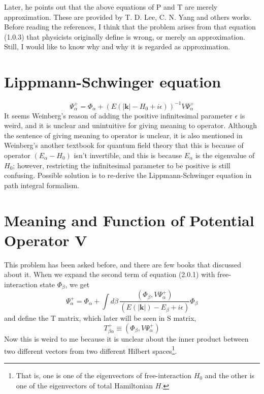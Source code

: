 \documentclass[12pt]{article}
\numberwithin{equation}{subsection}
\begin{document}
Later, he points out that the above equations of P and T are merely approximation.
These are provided by T. D. Lee, C. N. Yang and others works\cite{PhysRev.104.254}\cite{PhysRevLett.13.138}. 
Before reading the references, I think that the problem arises from that equation (1.0.3) that physicists originally define is wrong, or merely an approximation.
Still, I would like to know why and why it is regarded as approximation.
\section{Lippmann-Schwinger equation}
\begin{equation}
    \Psi_{\alpha}^{+} = \Phi_{\alpha}+\left(E(|\mathbf{k}|-H_{0}+i\epsilon)\right)^{-1}V\Psi_{\alpha}^{+}
\end{equation}
It seems Weinberg's reason\cite{Weinberg_2015} of adding the positive infinitesimal parameter $\epsilon$ is weird, and it is unclear and unintuitive for giving meaning to operator.
Although the sentence of giving meaning to operator is unclear, it is also mentioned in Weinberg's another textbook for quantum field theory\cite{Weinberg_1995_3} that this is because of operator $(E_{\alpha}-H_0)$ isn't invertible, and this is because $E_{\alpha}$ is the eigenvalue of $H_0$; however, restricting the infinitesimal parameter to be positive is still confusing.
Possible solution is to re-derive the Lippmann-Schwinger equation\cite{PhysRev.79.469} in path integral formalism.
\section{Meaning and Function of Potential Operator V}
This problem has been asked before\cite{676400}, and there are few books that discussed about it.
When we expand the second term of equation (2.0.1) with free-interaction state $\Phi_{\beta}$, we get
\begin{equation}
    \Psi_{\alpha}^{+} = \Phi_{\alpha} + \int{d\beta\,\frac{(\Phi_{\beta}, V\Psi_{\alpha}^{+})}{(E(|\mathbf{k}|)-E_{\beta}+i\epsilon)}\Phi_{\beta}}
\end{equation}
and define the T matrix, which later will be seen in S matrix,
\begin{equation}
    T_{\beta\alpha}^{+} \equiv (\Phi_{\beta}, V\Psi_{\alpha}^{+})
\end{equation}
Now this is weird to me because it is unclear about the inner product between two different vectors from two different Hilbert spaces\footnote{That is, one is one of the eigenvectors of free-interaction $H_0$ and the other is one of the eigenvectors of total Hamiltonian $H$.}.
\end{document}
